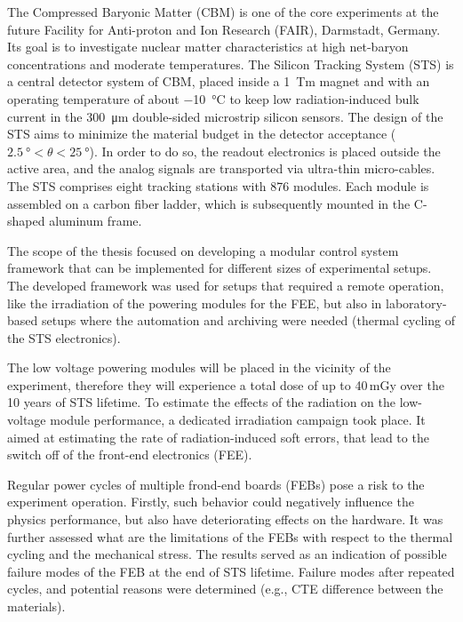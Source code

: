 The Compressed Baryonic Matter (CBM) is one of the core experiments at the future Facility for Anti-proton and Ion Research (FAIR), Darmstadt, Germany. Its goal is to investigate nuclear matter characteristics at high net-baryon concentrations and moderate temperatures. The Silicon Tracking System (STS) is a central detector system of CBM, placed inside a 1~Tm magnet and with an operating temperature of about \SI{-10}{\celsius} to keep low radiation-induced bulk current in the \SI{300}{\micro\metre} double-sided microstrip silicon sensors. The design of the STS aims to minimize the material budget in the detector acceptance ($\SI{2.5}{\degree} < \theta < \SI{25}{\degree}$). In order to do so, the readout electronics is placed outside the active area, and the analog signals are transported via ultra-thin micro-cables. The STS comprises eight tracking stations with 876 modules. Each module is assembled on a carbon fiber ladder, which is subsequently mounted in the C-shaped aluminum frame. 

The scope of the thesis focused on developing a modular control system framework that can be implemented for different sizes of experimental setups. The developed framework was used for setups that required a remote operation, like the irradiation of the powering modules for the \gls{FEE}, but also in laboratory-based setups where the automation and archiving were needed (thermal cycling of the \gls{STS} electronics).

The low voltage powering modules will be placed in the vicinity of the experiment, therefore they will experience a total dose of up to 40\,mGy over the 10 years of \gls{STS} lifetime. To estimate the effects of the radiation on the low-voltage module performance, a dedicated irradiation campaign took place. It aimed at estimating the rate of radiation-induced soft errors, that lead to the switch off of the front-end electronics (\gls{FEE}).

Regular power cycles of multiple frond-end boards (\glspl{FEB}) pose a risk to the experiment operation.  Firstly, such behavior could negatively influence the physics performance, but also have deteriorating effects on the hardware. It was further assessed what are the limitations of the \glspl{FEB} with respect to the thermal cycling and the mechanical stress. The results served as an indication of possible failure modes of the \gls{FEB} at the end of \gls{STS} lifetime. Failure modes after repeated cycles, and potential reasons were determined (e.g., \gls{CTE} difference between the materials). 

